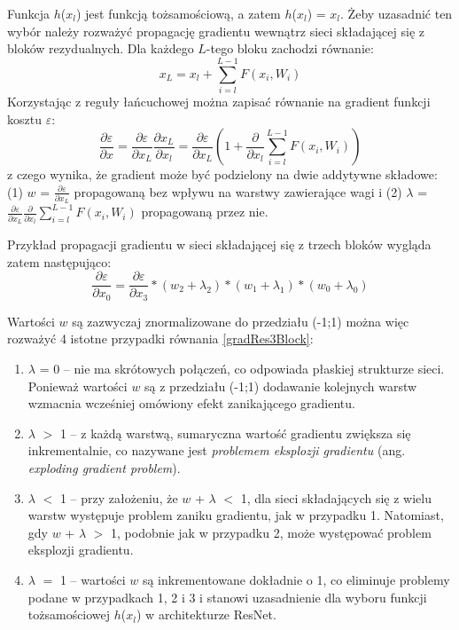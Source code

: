 Funkcja $h$($x_l$) jest funkcją tożsamościową, a zatem $h$($x_l$) = $x_l$. Żeby uzasadnić ten wybór należy rozważyć propagację gradientu wewnątrz sieci składającej się \linebreak z bloków rezydualnych. Dla każdego $L$-tego bloku zachodzi równanie:
\begin{equation}
x_L = x_l + \sum_{i=l}^{L-1}F(x_i, W_i)
\end{equation}
Korzystając z reguły łańcuchowej można zapisać równanie na gradient funkcji kosztu $\varepsilon$:
\begin{equation}
\label{gradResBlock}
\frac{\partial \varepsilon}{\partial x} =  \frac{\partial \varepsilon}{\partial x_L} \frac{\partial x_L}{\partial x_l} =  \frac{\partial \varepsilon}{\partial x_L}\left (1 +   \frac{\partial }{\partial x_l}\sum_{i=l}^{L-1}F(x_i, W_i) \right )
\end{equation}
z czego wynika, że gradient może być podzielony na dwie addytywne składowe: (1) $w$ = $\frac{\partial \varepsilon}{\partial x_L}$ propagowaną bez wpływu na warstwy zawierające wagi i (2) $\lambda$ = $\frac{\partial \varepsilon}{\partial x_L}\frac{\partial }{\partial x_l}\sum_{i=l}^{L-1}F(x_i, W_i)$ propagowaną przez nie.

Przykład propagacji gradientu w sieci składającej się z trzech bloków wygląda zatem następująco:
\begin{equation}
\label{gradRes3Block}
\frac{\partial \varepsilon}{\partial x_0} =  \frac{\partial \varepsilon}{\partial x_3}*(w_2+\lambda_2)*(w_1+\lambda_1)*(w_0+\lambda_0)
\end{equation}

Wartości $w$ są zazwyczaj znormalizowane do przedziału (-1;1) można więc rozważyć 4 istotne przypadki równania \ref{gradRes3Block}:
\begin{enumerate}
	\item $\lambda$ = 0 -- nie ma skrótowych połączeń, co odpowiada płaskiej strukturze sieci. Ponieważ wartości $w$ są z przedziału (-1;1) dodawanie kolejnych warstw wzmacnia wcześniej omówiony efekt zanikającego gradientu.
	\item $\lambda$ $>$ 1 -- z każdą warstwą, sumaryczna wartość gradientu zwiększa się inkrementalnie, co nazywane jest \textit{problemem eksplozji gradientu} (ang. \textit{exploding gradient problem}).
	\item $\lambda$ $<$ 1 -- przy założeniu, że $w$ + $\lambda$ $<$ 1, dla sieci składających się z wielu warstw występuje problem zaniku gradientu, jak w przypadku 1. Natomiast, gdy \linebreak $w$ + $\lambda$ $>$ 1, podobnie jak w przypadku 2, może występować problem eksplozji gradientu.
	\item $\lambda$ $=$ 1 -- wartości $w$ są inkrementowane dokładnie o 1, co eliminuje problemy podane w przypadkach 1, 2 i 3 i stanowi uzasadnienie dla wyboru funkcji tożsamościowej $h$($x_l$) w architekturze ResNet.
\end{enumerate}

